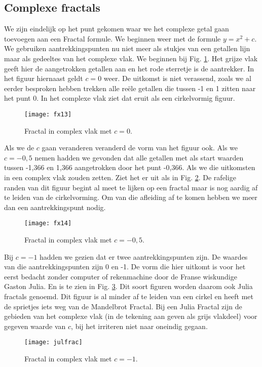 \documentclass[11pt,fleqn]{book} %
\begin{document}
\subsection{Complexe fractals}
We zijn eindelijk op het punt gekomen waar we het complexe getal gaan toevoegen aan een Fractal formule. We beginnen weer met de formule $y=x^2+c$. We gebruiken aantrekkingspunten nu niet meer als stukjes van een getallen lijn maar als gedeeltes van het complexe vlak. We beginnen bij Fig. \ref{fig:fx13}. Het grijze vlak geeft hier de aangetrokken getallen aan en het rode sterretje is de aantrekker. In het figuur hiernaast geldt $c=0$ weer. De uitkomst is niet verassend, zoals we al eerder besproken hebben trekken alle reële getallen die tussen -1 en 1 zitten naar het punt 0. In het complexe vlak ziet dat eruit als een cirkelvormig figuur.
\begin{figure}[h]
	\centering\texttt{[image: fx13]}
	\caption{Fractal in complex vlak met $c=0$.}
	\label{fig:fx13}
\end{figure}
Als we de $c$ gaan veranderen veranderd de vorm van het figuur ook. Als we $c=-0,5$ nemen hadden we gevonden dat alle getallen met als start waarden tussen -1,366 en 1,366 aangetrokken door het punt -0,366. Als we die uitkomsten in een complex vlak zouden zetten. Ziet het er uit als in Fig. \ref{fig:fx14}. De rafelige randen van dit figuur begint al meet te lijken op een fractal maar is nog aardig af te leiden van de cirkelvorming.
Om van die afleiding af te komen hebben we meer dan een aantrekkingspunt nodig. 
\begin{figure}[h]
	\centering\texttt{[image: fx14]}
	\caption{Fractal in complex vlak met $c=-0,5$.}
	\label{fig:fx14}
\end{figure}
Bij $c=-1$ hadden we gezien dat er twee aantrekkingspunten zijn. De waardes van die aantrekkingspunten zijn 0 en -1. De vorm die hier uitkomt is voor het eerst bedacht zonder computer of rekenmachine door de Franse wiskundige Gaston Julia. En is te zien in Fig. \ref{fig:julfrac}. Dit soort figuren worden daarom ook Julia fractals genoemd. Dit figuur is al minder af te leiden van een cirkel en heeft met de sprietjes iets weg van de Mandelbrot Fractal.
Bij een Julia Fractal zijn de gebieden van het complexe vlak (in de tekening aan geven als grijs vlakdeel) voor gegeven waarde van $c$, bij het irriteren niet naar oneindig gegaan.
\begin{figure}[h]
	\centering\texttt{[image: julfrac]}
	\caption{Fractal in complex vlak met $c=-1$.}
	\label{fig:julfrac}
\end{figure}
\end{document}
